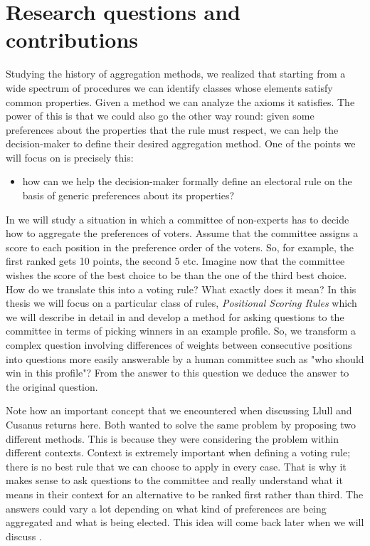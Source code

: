 \section{Research questions and contributions}
Studying the history of aggregation methods, we realized that starting from a wide spectrum of procedures we can identify classes whose elements satisfy common properties. Given a method we can analyze the axioms it satisfies.
The power of this is that we could also go the other way round: given some preferences about the properties that the rule must respect, we can help the decision-maker to define their desired aggregation method. 
One of the points we will focus on is precisely this: 
\begin{itemize}
	\item how can we help the decision-maker formally define an electoral rule on the basis of generic preferences about its properties?
\end{itemize}
In  we will study a situation in which a committee of non-experts has to decide how to aggregate the preferences of voters. 
Assume that the committee assigns a score to each position in the preference order of the voters. So, for example, the first ranked gets 10 points, the second 5 etc.
Imagine now that the committee wishes the score of the best choice to be  than the one of the third best choice.
How do we translate this  into a voting rule? What exactly does it mean?
In this thesis we will focus on a particular class of rules, \textit{Positional Scoring Rules} \textemdash which we will describe in detail in  \textemdash and develop a method for asking questions to the committee in terms of picking winners in an example profile. 
So, we transform a complex question involving differences of weights between consecutive positions into questions more easily answerable by a human committee such as "who should win in this profile"? From the answer to this question we deduce the answer to the original question.

Note how an important concept that we encountered when discussing Llull and Cusanus returns here. Both wanted to solve the same problem by proposing two different methods. This is because they were considering the problem within different contexts.
Context is extremely important when defining a voting rule; there is no best rule that we can choose to apply in every case. That is why it makes sense to ask questions to the committee and really understand what it means in their context for an alternative to be ranked first rather than third. The answers could vary a lot depending on what kind of preferences are being aggregated and what is being elected. This idea will come back later when we will discuss .

